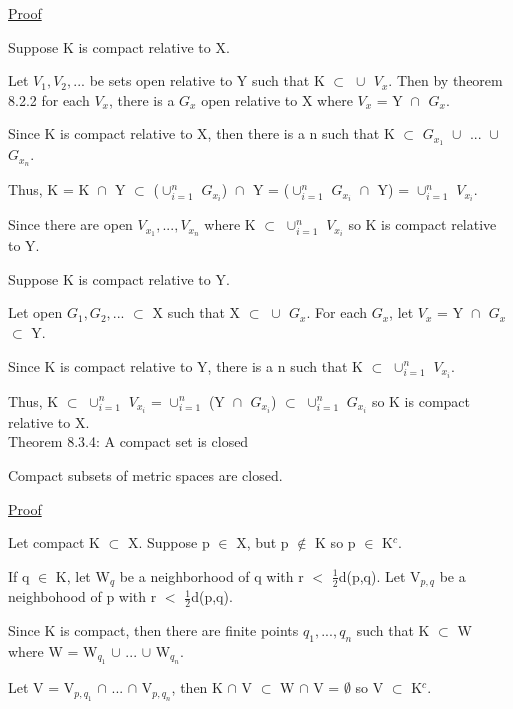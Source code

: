 { \color{magenta} \underline{Proof} } 

	Suppose K is compact relative to X.

	Let $V_1, V_2, ...$ be sets open relative to Y such that
	K $\subset$ $\cup_{}^{}$ $V_x$.
	Then by {\color{red} theorem 8.2.2} for each $V_x$, there is a
	$G_x$ open relative to X where $V_x$ = Y $\cap_{}^{}$ $G_x$.

	Since K is compact relative to X, then there is a n such that
	K $\subset$ $G_{x_1}$ $\cup_{}^{}$ ... $\cup_{}^{}$ $G_{x_n}$.

	Thus, K = K $\cap_{}^{}$ Y $\subset$ ($\cup_{i=1}^{n}$ $G_{x_i}$) $\cap_{}^{}$ Y
	= ($\cup_{i=1}^{n}$ $G_{x_i}$ $\cap_{}^{}$ Y) = $\cup_{i=1}^{n}$ $V_{x_i}$.
	
	Since there are open $V_{x_1}, ... , V_{x_n}$ where
	K $\subset$ $\cup_{i=1}^{n}$ $V_{x_i}$ so K is compact relative to Y.

	Suppose K is compact relative to Y.

	Let open $G_1, G_2, ...$ $\subset$ X such that X $\subset$ $\cup_{}^{}$ $G_x$.
	For each $G_x$, let $V_x$ = Y $\cap_{}^{}$ $G_x$ $\subset$ Y.

	Since K is compact relative to Y, there is a n such that
	K $\subset$ $\cup_{i=1}^{n}$ $V_{x_i}$.

	Thus, K $\subset$ $\cup_{i=1}^{n}$ $V_{x_i}$
	= $\cup_{i=1}^{n}$ (Y $\cap_{}^{}$ $G_{x_i}$)
	$\subset$ $\cup_{i=1}^{n}$ $G_{x_i}$ so K is compact relative to X. \\

{ \color{red} Theorem 8.3.4: A compact set is closed } 

	\begin{adjustbox}{minipage=14cm, right, vspace=0.1cm 0cm}
		Compact subsets of metric spaces are closed.
	\end{adjustbox}

{ \color{magenta} \underline{Proof} } 

	Let compact K $\subset$ X.
	Suppose p $\in$ X, but p $\not \in$ K so p $\in$ K$^c$.

	If q $\in$ K, let W$_q$ be a neighborhood of q with
	r $<$ $\frac{1}{2}$d(p,q).
	Let V$_{p,q}$ be a neighbohood of p with r $<$ $\frac{1}{2}$d(p,q).

	Since K is compact, then there are finite points $q_1, ... , q_n$
	such that K $\subset$ W where W = W$_{q_1}$ $\cup$ ... $\cup$ W$_{q_n}$.

	Let V = V$_{p,q_1}$ $\cap$ ... $\cap$ V$_{p,q_n}$, then
	K $\cap$ V $\subset$ W $\cap$ V = $\emptyset$ so V $\subset$ K$^c$.

